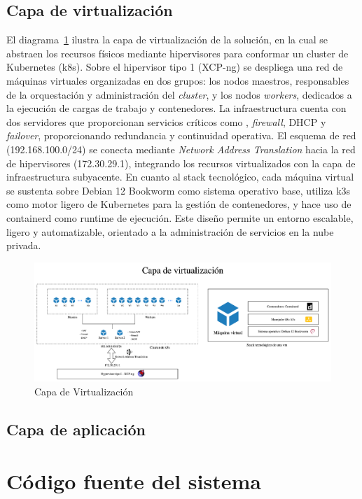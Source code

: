 \subsection{Capa de virtualización}
\noindent
El diagrama~\ref{fig:virtualizacion} ilustra la capa de virtualización de la solución, en la cual se abstraen los recursos físicos mediante hipervisores para conformar un cluster de Kubernetes (k8s). Sobre el hipervisor tipo 1 (XCP-ng) se despliega una red de máquinas virtuales organizadas en dos grupos: los nodos maestros, responsables de la orquestación y administración del \textit{cluster}, y los nodos \textit{workers}, dedicados a la ejecución de cargas de trabajo y contenedores.
\noindent
La infraestructura cuenta con dos servidores que proporcionan servicios críticos como \NAT, \textit{firewall}, DHCP y \textit{failover}, proporcionando redundancia y continuidad operativa. El esquema de red (192.168.100.0/24) se conecta mediante \textit{Network Address Translation} hacia la red de hipervisores (172.30.29.1), integrando los recursos virtualizados con la capa de infraestructura subyacente.
\noindent
En cuanto al stack tecnológico, cada máquina virtual se sustenta sobre Debian 12 Bookworm como sistema operativo base, utiliza k3s como motor ligero de Kubernetes para la gestión de contenedores, y hace uso de containerd como runtime de ejecución. Este diseño permite un entorno escalable, ligero y automatizable, orientado a la administración de servicios en la nube privada.
\begin{figure}[H]
    \centering
    \includegraphics[width=\textwidth]{tablas-images/cp6/disenio-N2.png}
    \caption{Capa de Virtualización}\label{fig:virtualizacion}
\end{figure}

\subsection{Capa de aplicación}

\section{Código fuente del sistema}
